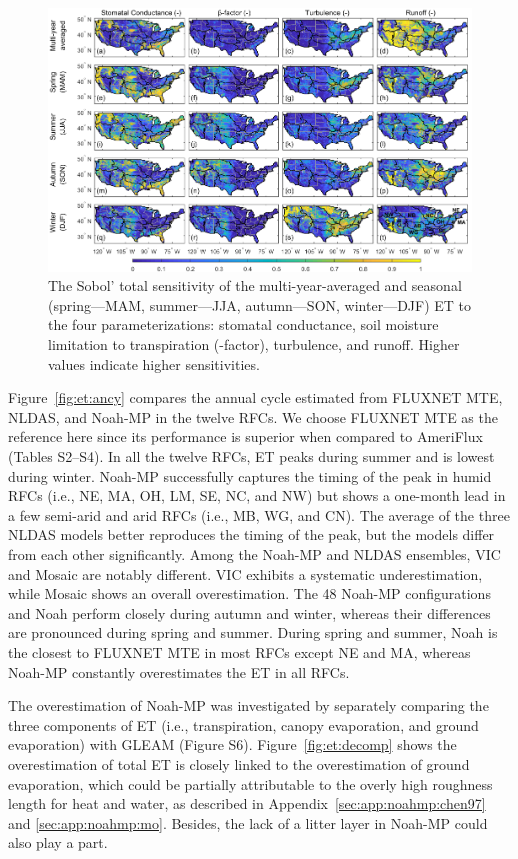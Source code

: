 \documentclass[essd, manuscript]{copernicus}
\begin{document}
\begin{figure}[t]
  \includegraphics[width=17cm]{fig/fig14.pdf}
  \caption{The Sobol' total sensitivity of the multi-year-averaged and seasonal (spring---MAM, summer---JJA, autumn---SON, winter---DJF) ET to the four parameterizations: stomatal conductance, soil moisture limitation to transpiration (\beta{}-factor), turbulence, and runoff. Higher values indicate higher sensitivities.}
  \label{fig:et:sens}
\end{figure}

Figure~\ref{fig:et:ancy} compares the annual cycle estimated from FLUXNET MTE, NLDAS, and Noah-MP in the twelve RFCs. We choose FLUXNET MTE as the reference here since its performance is superior when compared to AmeriFlux (Tables S2--S4). In all the twelve RFCs, ET peaks during summer and is lowest during winter. Noah-MP successfully captures the timing of the peak in humid RFCs (i.e., NE, MA, OH, LM, SE, NC, and NW) but shows a one-month lead in a few semi-arid and arid RFCs (i.e., MB, WG, and CN). The average of the three NLDAS models better reproduces the timing of the peak, but the models differ from each other significantly. Among the Noah-MP and NLDAS ensembles, VIC and Mosaic are notably different. VIC exhibits a systematic underestimation, while Mosaic shows an overall overestimation. The 48 Noah-MP configurations and Noah perform closely during autumn and winter, whereas their differences are pronounced during spring and summer. During spring and summer, Noah is the closest to FLUXNET MTE in most RFCs except NE and MA, whereas Noah-MP constantly overestimates the ET in all RFCs.

The overestimation of Noah-MP was investigated by separately comparing the three components of ET (i.e., transpiration, canopy evaporation, and ground evaporation) with GLEAM (Figure S6). Figure~\ref{fig:et:decomp} shows the overestimation of total ET is closely linked to the overestimation of ground evaporation, which could be partially attributable to the overly high roughness length for heat and water, as described in Appendix~\ref{sec:app:noahmp:chen97} and \ref{sec:app:noahmp:mo}. Besides, the lack of a litter layer \citep{decker2017JAMES} in Noah-MP could also play a part.
\end{document}
